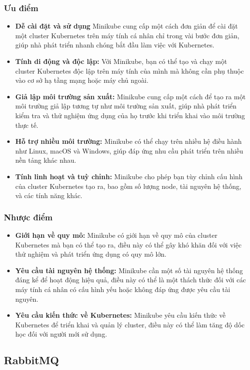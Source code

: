 \subsubsection{Ưu điểm}
\begin{itemize}
  \item \textbf{Dễ cài đặt và sử dụng} Minikube cung cấp một cách đơn giản để cài đặt một cluster Kubernetes trên máy tính cá nhân chỉ trong vài bước đơn giản, giúp nhà phát triển nhanh chóng bắt đầu làm việc với Kubernetes.
  \item \textbf{Tính di động và độc lập:} Với Minikube, bạn có thể tạo và chạy một cluster Kubernetes độc lập trên máy tính của mình mà không cần phụ thuộc vào cơ sở hạ tầng mạng hoặc máy chủ ngoài.
  \item \textbf{Giả lập môi trường sản xuất:} Minikube cung cấp một cách để tạo ra một môi trường giả lập tương tự như môi trường sản xuất, giúp nhà phát triển kiểm tra và thử nghiệm ứng dụng của họ trước khi triển khai vào môi trường thực tế.
  \item \textbf{Hỗ trợ nhiều môi trường:} Minikube có thể chạy trên nhiều hệ điều hành như Linux, macOS và Windows, giúp đáp ứng nhu cầu phát triển trên nhiều nền tảng khác nhau.
  \item \textbf{Tính linh hoạt và tuỳ chỉnh:} Minikube cho phép bạn tùy chỉnh cấu hình của cluster Kubernetes tạo ra, bao gồm số lượng node, tài nguyên hệ thống, và các tính năng khác.
\end{itemize} 
\subsubsection{Nhược điểm}
\begin{itemize}
  \item \textbf{Giới hạn về quy mô:} Minikube có giới hạn về quy mô của cluster Kubernetes mà bạn có thể tạo ra, điều này có thể gây khó khăn đối với việc thử nghiệm và phát triển ứng dụng có quy mô lớn.
  \item \textbf{Yêu cầu tài nguyên hệ thống:} Minikube cần một số tài nguyên hệ thống đáng kể để hoạt động hiệu quả, điều này có thể là một thách thức đối với các máy tính cá nhân có cấu hình yếu hoặc không đáp ứng được yêu cầu tài nguyên.
  \item \textbf{Yêu cầu kiến thức về Kubernetes:} Minikube yêu cầu kiến thức về Kubernetes để triển khai và quản lý cluster, điều này có thể làm tăng độ dốc học đối với người mới sử dụng.
\end{itemize}
\subsection{RabbitMQ}
